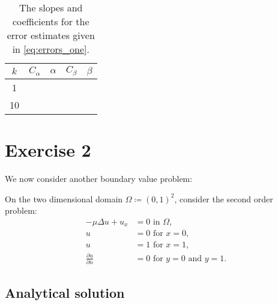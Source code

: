 \documentclass[]{article}
\begin{document}
\begin{table}[htpb]
    \centering
    \caption{The slopes and coefficients for the error estimates given in
    \cref{eq:errors_one}.}
    \label{tbl:polyfit_one}
    \begin{tabular}{ccccc}
        \toprule
        $k$ & $C_\alpha$ & $\alpha$ & $C_\beta$ & $\beta$\\
        \midrule
        1 & & & & \\
        10 & & & & \\
        \bottomrule
    \end{tabular}
\end{table}

\section*{Exercise 2}
\label{sec:exercise_2}

We now consider another boundary value problem:
\begin{BVP}
    \label{bvp:two}
    On the two dimensional domain $\Omega \coloneqq (0, 1)^2$, consider the
    second order problem:
    \begin{align}
        \label{eq:problem_2}
        -\mu\Delta u + u_x &= 0 \text{ in } \Omega,\\ 
        u &= 0 \text{ for } x = 0,\label{eq:d_one} \\
        u &= 1 \text{ for } x = 1,\label{eq:d_two}\\
        \frac{\partial u}{\partial n} &= 0 \text{ for } y = 0 \text{ and } y = 1.\label{eq:neumann}
    \end{align}
\end{BVP}

\subsection*{Analytical solution}
\label{sec:analytical_solution}
\end{document}
